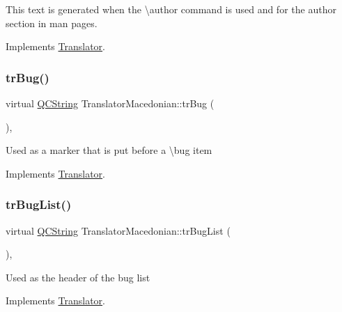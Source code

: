 This text is generated when the \textbackslash{}author command is used and for the author section in man pages. 

Implements \mbox{\hyperlink{class_translator}{Translator}}.

\mbox{\label{class_translator_macedonian_a28fa6d85d2480c12badc6a18acb1161e}} 
\subsubsection{\texorpdfstring{trBug()}{trBug()}}
{\footnotesize\ttfamily virtual \mbox{\hyperlink{class_q_c_string}{Q\+C\+String}} Translator\+Macedonian\+::tr\+Bug (\begin{DoxyParamCaption}{ }\end{DoxyParamCaption})\hspace{0.3cm}{\ttfamily [inline]}, {\ttfamily [virtual]}}

Used as a marker that is put before a \textbackslash{}bug item 

Implements \mbox{\hyperlink{class_translator}{Translator}}.

\mbox{\label{class_translator_macedonian_aed6ea3cd9a5c2f2ab0e0cfb5db7a8226}} 
\subsubsection{\texorpdfstring{trBugList()}{trBugList()}}
{\footnotesize\ttfamily virtual \mbox{\hyperlink{class_q_c_string}{Q\+C\+String}} Translator\+Macedonian\+::tr\+Bug\+List (\begin{DoxyParamCaption}{ }\end{DoxyParamCaption})\hspace{0.3cm}{\ttfamily [inline]}, {\ttfamily [virtual]}}

Used as the header of the bug list 

Implements \mbox{\hyperlink{class_translator}{Translator}}.

\mbox{\label{class_translator_macedonian_ae6ec7166ec1b58d7e9374e85f6b314c8}} 
